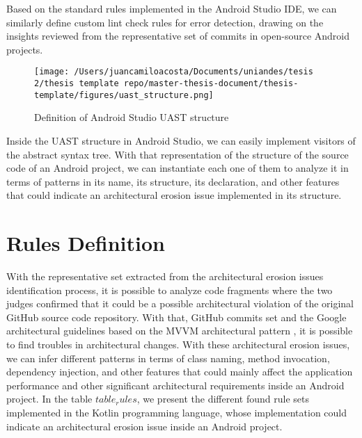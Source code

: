 Based on the standard rules implemented in the Android Studio IDE, we can similarly define custom lint check rules for error detection, drawing on the insights reviewed from the representative set of commits in open-source Android projects. 

\begin{figure}[h]
    	\centering
    		\texttt{[image: /Users/juancamiloacosta/Documents/uniandes/tesis 2/thesis template repo/master-thesis-document/thesis-template/figures/uast\_structure.png]}
   			 \caption{Definition of Android Studio UAST structure \citet{} }
   			 \label{fig:ast}
\end{figure}

Inside the UAST structure in Android Studio, we can easily implement visitors of the abstract syntax tree. With that representation of the structure of the source code of an Android project, we can instantiate each one of them to analyze it in terms of patterns in its name, its structure, its declaration, and other features that could indicate an architectural erosion issue implemented in its structure.

\section{Rules Definition}
With the representative set extracted from the architectural erosion issues identification process, it is possible to analyze code fragments where the two judges confirmed that it could be a possible architectural violation of the original GitHub source code repository. With that, GitHub commits set and the Google architectural guidelines based on the MVVM architectural pattern \citet{}, it is possible to find troubles in architectural changes. With these architectural erosion issues, we can infer different patterns in terms of class naming, method invocation, dependency injection, and other features that could mainly affect the application performance and other significant architectural requirements inside an Android project. In the table $table_rules$, we present the different found rule sets implemented in the Kotlin programming language, whose implementation could indicate an architectural erosion issue inside an Android project.


